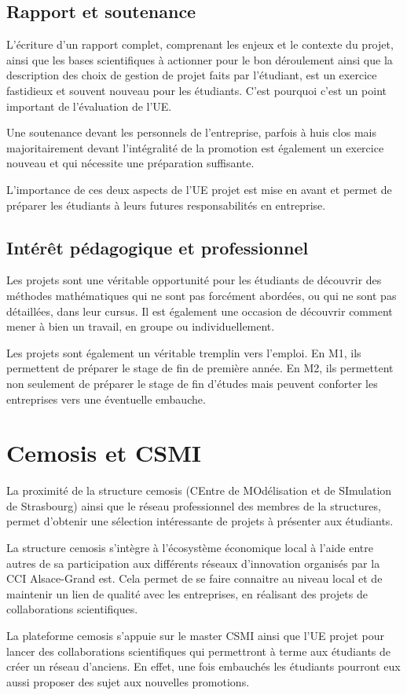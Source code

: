 \documentclass{matapli}
\begin{document}
\subsection*{Rapport et soutenance}
L'écriture d'un rapport complet, comprenant les enjeux et le contexte du projet, ainsi que les bases scientifiques à actionner pour le bon déroulement ainsi que la description des choix de gestion de projet faits par l'étudiant, est un exercice fastidieux et souvent nouveau pour les étudiants. C'est pourquoi c'est un point important de l'évaluation de l'UE.

Une soutenance devant les personnels de l'entreprise, parfois à huis clos mais majoritairement devant l'intégralité de la promotion est également un exercice nouveau et qui nécessite une préparation suffisante.

L'importance de ces deux aspects de l'UE projet est mise en avant et permet de préparer les étudiants à leurs futures responsabilités en entreprise.

\subsection*{Intérêt pédagogique et professionnel}
Les projets sont une véritable opportunité pour les étudiants de découvrir des méthodes mathématiques qui ne sont pas forcément abordées, ou qui ne sont pas détaillées, dans leur cursus. Il est également une occasion de découvrir comment mener à bien un travail, en groupe ou individuellement.

Les projets sont également un véritable tremplin vers l'emploi. En M1, ils permettent de préparer le stage de fin de première année. En M2, ils permettent non seulement de préparer le stage de fin d'études mais peuvent conforter les entreprises vers une éventuelle embauche.

\section*{Cemosis et CSMI}
La proximité de la structure cemosis (CEntre de MOdélisation et de SImulation de Strasbourg) ainsi que le réseau professionnel des membres de la structures, permet d'obtenir une sélection intéressante de projets à présenter aux étudiants. 

La structure cemosis s'intègre à l'écosystème économique local à l'aide entre autres de sa participation aux différents réseaux d'innovation organisés par la CCI Alsace-Grand est. Cela permet de se faire connaitre au niveau local et de maintenir un lien de qualité avec les entreprises, en réalisant des projets de collaborations scientifiques.

La plateforme cemosis s'appuie sur le master CSMI ainsi que l'UE projet pour lancer des collaborations scientifiques qui permettront à terme aux étudiants de créer un réseau d'anciens. En effet, une fois embauchés les étudiants pourront eux aussi proposer des sujet aux nouvelles promotions.
\end{document}
